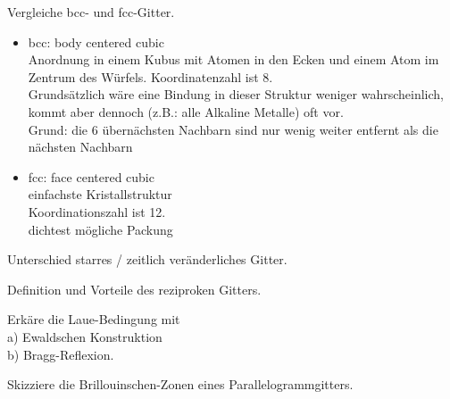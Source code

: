\documentclass[a5paper,12pt,ngerman,grid=front %
,print
]{kartei}
\begin{document}
	\begin{karte}{
		Vergleiche bcc- und fcc-Gitter.
		}
		
		\begin{itemize}
			\item bcc: body centered cubic \\
				Anordnung in einem Kubus mit Atomen in den Ecken und einem Atom im Zentrum des Würfels.
				Koordinatenzahl ist 8. \\
				Grundsätzlich wäre eine Bindung in dieser Struktur weniger wahrscheinlich, kommt aber dennoch (z.B.: alle Alkaline Metalle) oft vor.\\
				Grund: die 6 übernächsten Nachbarn sind nur wenig weiter entfernt als die nächsten Nachbarn
				
			\item fcc: face centered cubic \\
				einfachste Kristallstruktur \\
				Koordinationszahl ist 12. \\
				dichtest mögliche Packung
		\end{itemize}
		
	\end{karte}


	\begin{karte}{
		Unterschied starres / zeitlich veränderliches Gitter.
		}
		
		
		
	\end{karte}


	\begin{karte}{
		Definition und Vorteile des reziproken Gitters.
		}
		
		
		
	\end{karte}


	\begin{karte}{
		Erkäre die Laue-Bedingung mit \\
		a) Ewaldschen Konstruktion \\
		b) Bragg-Reflexion.
		}
		
		
		
	\end{karte}


	\begin{karte}{
		Skizziere die Brillouinschen-Zonen eines Parallelogrammgitters.
		}
		
		
		
	\end{karte}
\end{document}
